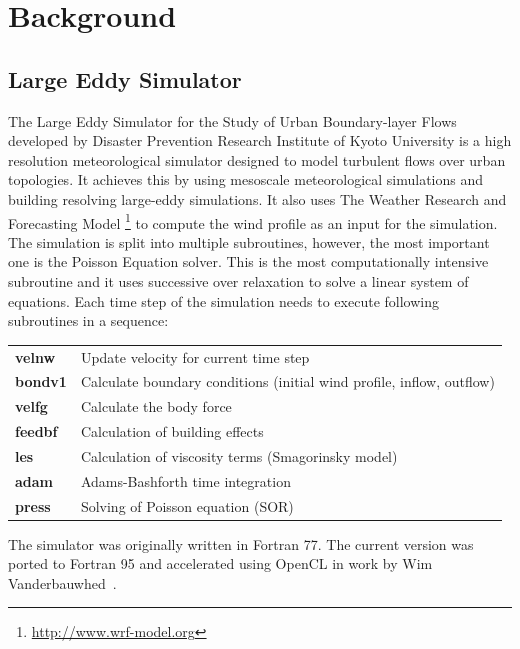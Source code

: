 \documentclass{l4proj}
\begin{document}
\chapter{Background}
\label{chap:background}

\section{Large Eddy Simulator}

The Large Eddy Simulator for the Study of Urban Boundary-layer Flows developed by
Disaster Prevention Research Institute of Kyoto University is a high resolution
meteorological simulator designed to model turbulent flows over urban topologies. 
It achieves this by using mesoscale meteorological simulations and building resolving
large-eddy simulations. It also uses The Weather Research and Forecasting Model \footnote{\url{http://www.wrf-model.org}}
to compute the wind profile as an input for the simulation. The simulation is split into
multiple subroutines, however, the most important one is the Poisson Equation solver.
This is the most computationally intensive subroutine and it uses successive over relaxation to solve
a linear system of equations. Each time step of the simulation needs to execute following subroutines
in a sequence:

\begin{tabular}{ | l | l | }
  \hline  
  \textbf{velnw} & Update velocity for current time step \\
  \textbf{bondv1} & Calculate boundary conditions (initial wind profile, inflow, outflow) \\
  \textbf{velfg} & Calculate the body force \\
  \textbf{feedbf} & Calculation of building effects \\
  \textbf{les} & Calculation of viscosity terms (Smagorinsky model) \\
  \textbf{adam} & Adams-Bashforth time integration \\
  \textbf{press} & Solving of Poisson equation (SOR) \\
  \hline  
\end{tabular}

The simulator was originally written in Fortran 77. The current version was ported to Fortran 95
and accelerated using OpenCL in work by Wim Vanderbauwhed~\cite{les_wim}.
\end{document}
